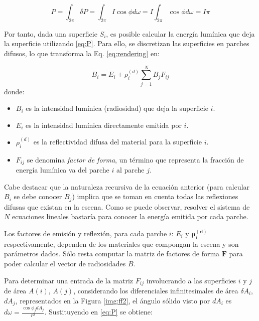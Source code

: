 \begin{equation}
    P = \int_{2\pi} \delta{P} = \int_{2\pi} I\cos{\phi}d{\omega} = I \int_{2\pi} \cos{\phi}d{\omega} = I\pi
    \label{eq:P}
\end{equation}

Por tanto, dada una superficie $S_{i}$, es posible calcular la energía lumínica que deja la superficie utilizando \eqref{eq:P}. Para ello, se discretizan las superficies en parches difusos, lo que transforma la Eq. \eqref{eq:rendering} en:

\begin{equation}
    B_{i} = E_{i} + \rho^{(d)}_{i} \sum_{j=1}^{N} B_{j} F_{ij} \label{eq:radiosity}
\end{equation}
donde:
\begin{itemize}
    \item $B_{i}$ es la intensidad lumínica (radiosidad) que deja la superficie $i$.
    \item $E_{i}$ es la intensidad lumínica directamente emitida por $i$.
    \item $\rho^{(d)}_{i}$ es la reflectividad difusa del material para la superficie $i$.
    \item $F_{ij}$ se denomina \textit{factor de forma}, un término que representa la fracción de energía lumínica va del parche $i$ al parche $j$. 
\end{itemize}

Cabe destacar que la naturaleza recursiva de la ecuación anterior (para calcular $B_{i}$ se debe conocer $B_{j}$) implica que se toman en cuenta todas las reflexiones difusas que existan en la escena. Como se puede observar, resolver el sistema de $N$ ecuaciones lineales bastaría para conocer la energía emitida por cada parche. 

Los factores de emisión y reflexión, para cada parche $i$: $E_{i}$ y $\mathbf{\rho^{(d)}_{i}}$ respectivamente, dependen de los materiales que compongan la escena y son parámetros dados. Sólo resta computar la matriz de factores de forma $\mathbf{F}$ para poder calcular el vector de radiosidades $B$. 

Para determinar una entrada de la matriz $F_{ij}$ involucrando a las superficies $i$ y $j$ de área $A(i)$, $A(j)$, considerando los diferenciales infinitesimales de área $\delta{A_{i}}$, $d{A_{j}}$, representados en la Figura \ref{img:ff2}, el ángulo sólido visto por $d{A_{i}}$ es $d{\omega} = \frac{\cos{\phi_{j}d{A_{j}}}}{r^{2}}$. Sustituyendo en \eqref{eq:P} se obtiene:

